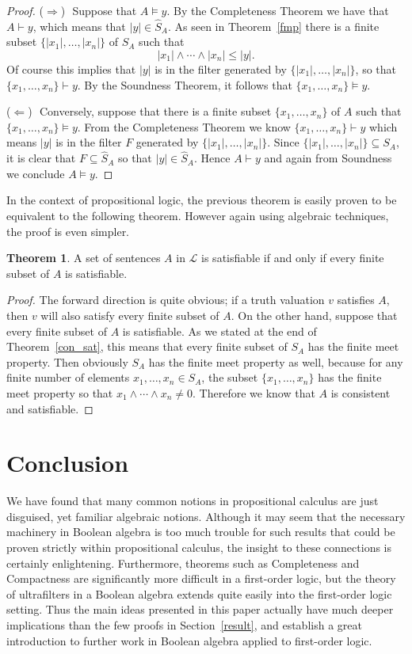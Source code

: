 \documentclass[11pt,titlepage]{article}
\newcommand{\Lan}{\mathcal{L}}
\newcommand{\forward}{\noindent ($\Longrightarrow$) \,\,}
\newcommand{\back}{\noindent ($\Longleftarrow$) \,\,}
\theoremstyle{definition}
\newtheorem{theorem}[definition]{Theorem}
\begin{document}
\begin{proof}\forward Suppose that $A\vDash y$. By the Completeness Theorem we have that $A\vdash y$, which means that $|y|\in \hat{S}_A$. As seen in Theorem~\ref{fmp} there is a finite subset $\{|x_1|,\ldots,|x_n|\}$ of $S_A$ such that $$|x_1|\land\cdots\land |x_n| \le |y|.$$ Of course this implies that $|y|$ is in the filter generated by $\{|x_1|,\ldots,|x_n|\}$, so that $\{x_1,\ldots,x_n\} \vdash y$. By the Soundness Theorem, it follows that $\{x_1,\ldots,x_n\} \vDash y$.

\back Conversely, suppose that there is a finite subset $\{x_1,\ldots,x_n\}$ of $A$ such that $\{x_1,\ldots,x_n\}\vDash y.$ From the Completeness Theorem we know $\{x_1,\ldots,x_n\}\vdash y$ which means $|y|$ is in the filter $F$ generated by $\{|x_1|,\ldots,|x_n|\}.$ Since $\{|x_1|,\ldots,|x_n|\}\subseteq S_A$, it is clear that $F\subseteq \hat{S}_A$ so that $|y|\in\hat{S}_A$. Hence $A\vdash y$ and again from Soundness we conclude $A\vDash y.$\end{proof}

In the context of propositional logic, the previous theorem is easily proven to be equivalent to the following theorem. However again using algebraic techniques, the proof is even simpler.

\begin{theorem} A set of sentences $A$ in $\Lan$ is satisfiable if and only if every finite subset of $A$ is satisfiable.\end{theorem}

\begin{proof} The forward direction is quite obvious; if a truth valuation $v$ satisfies $A$, then $v$ will also satisfy every finite subset of $A$. On the other hand, suppose that every finite subset of $A$ is satisfiable. As we stated at the end of Theorem~\ref{con_sat}, this means that every finite subset of $S_A$ has the finite meet property. Then obviously $S_A$ has the finite meet property as well, because for any finite number of elements $x_1,\ldots,x_n\in S_A$, the subset $\{x_1,\ldots,x_n\}$ has the finite meet property so that $x_1\land\cdots\land x_n \ne 0.$ Therefore we know that $A$ is consistent and satisfiable.
\end{proof}

\section{Conclusion}
We have found that many common notions in propositional calculus are just disguised, yet familiar algebraic notions. Although it may seem that the necessary machinery in Boolean algebra is too much trouble for such results that could be proven strictly within propositional calculus, the insight to these connections is certainly enlightening. Furthermore, theorems such as Completeness and Compactness are significantly more difficult in a first-order logic, but the theory of ultrafilters in a Boolean algebra extends quite easily into the first-order logic setting. Thus the main ideas presented in this paper actually have much deeper implications than the few proofs in Section~\ref{result}, and establish a great introduction to further work in Boolean algebra applied to first-order logic.
\end{document}
